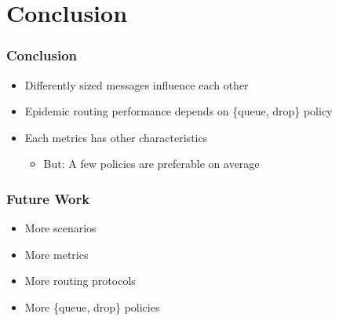 \section{Conclusion}

\begin{frame}
  \frametitle{Conclusion}
  \begin{itemize}  
    \item Differently sized messages influence each other
    \vspace{0.3cm}
    \item Epidemic routing performance depends on \{queue, drop\} policy
    \vspace{0.3cm}
    \item Each metrics has other characteristics
    \begin{itemize} 
      \item But: A few policies are preferable on average
    \end{itemize}   
  \end{itemize}		
\end{frame}


\begin{frame}
  \frametitle{Future Work}
  \begin{itemize}
	  \item More scenarios
    \vspace{0.3cm}
    \item More metrics
	  \vspace{0.3cm}	  
	  \item More routing protocols
    \vspace{0.3cm}
    \item More \{queue, drop\} policies    
  \end{itemize}		
\end{frame}